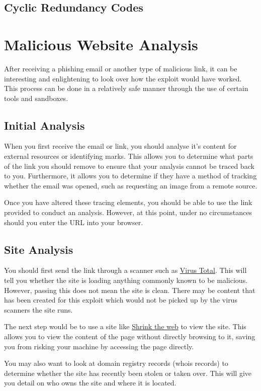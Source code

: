		\subsection{Cyclic Redundancy Codes}
	\section{Malicious Website Analysis}
		After receiving a phishing email or another type of malicious link, it can be interesting and enlightening to look over how the exploit would have worked. 
		This process can be done in a relatively safe manner through the use of certain tools and sandboxes. 

		\subsection{Initial Analysis}
			When you first receive the email or link, you should analyse it's content for external resources or identifying marks.
			This allows you to determine what parts of the link you should remove to ensure that your analysis cannot be traced back to you. 
			Furthermore, it allows you to determine if they have a method of tracking whether the email was opened, such as requesting an image from a remote source. 

			Once you have altered these tracing elements, you should be able to use the link provided to conduct an analysis. 
			However, at this point, under no circumstances should you enter the URL into your browser. 

		\subsection{Site Analysis}
			You should first send the link through a scanner such as \href{virustotal.com}{Virus Total}. 
			This will tell you whether the site is loading anything commonly known to be malicious. 
			However, passing this does not mean the site is clean. 
			There may be content that has been created for this exploit which would not be picked up by the virus scanners the site runs. 

			The next step would be to use a site like \href{shrinktheweb.com}{Shrink the web} to view the site. 
			This allows you to view the content of the page without directly browsing to it, 
			saving you from risking your machine by accessing the page directly. 

			You may also want to look at domain registry records (whois records) to determine whether the site has recently been stolen or taken over. 
			This will give you detail on who owns the site and where it is located. 

